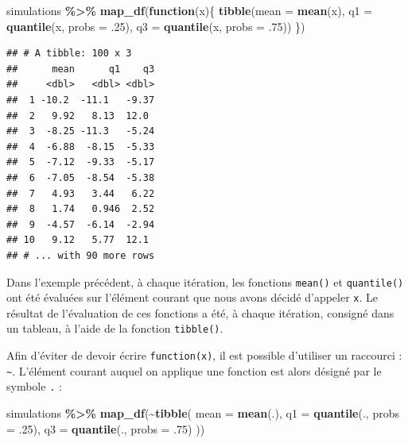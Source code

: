 \documentclass[
  11pt,
]{book}
\newenvironment{Shaded}{\begin{snugshade}}{\end{snugshade}}
\newcommand{\ControlFlowTok}[1]{\textcolor[rgb]{0.13,0.29,0.53}{\textbf{#1}}}
\newcommand{\DataTypeTok}[1]{\textcolor[rgb]{0.13,0.29,0.53}{#1}}
\newcommand{\FloatTok}[1]{\textcolor[rgb]{0.00,0.00,0.81}{#1}}
\newcommand{\KeywordTok}[1]{\textcolor[rgb]{0.13,0.29,0.53}{\textbf{#1}}}
\newcommand{\NormalTok}[1]{#1}
\newcommand{\OperatorTok}[1]{\textcolor[rgb]{0.81,0.36,0.00}{\textbf{#1}}}
\newcommand{\StringTok}[1]{\textcolor[rgb]{0.31,0.60,0.02}{#1}}
\numberwithin{equation}{section}
\numberwithin{countremarque}{section}
\begin{document}
\begin{Shaded}
\begin{Highlighting}[]
\NormalTok{simulations }\OperatorTok{\%\textgreater{}\%}\StringTok{ }
\StringTok{  }\KeywordTok{map\_df}\NormalTok{(}\ControlFlowTok{function}\NormalTok{(x)\{}
    \KeywordTok{tibble}\NormalTok{(}\DataTypeTok{mean =} \KeywordTok{mean}\NormalTok{(x),}
           \DataTypeTok{q1 =} \KeywordTok{quantile}\NormalTok{(x, }\DataTypeTok{probs =} \FloatTok{.25}\NormalTok{),}
           \DataTypeTok{q3 =} \KeywordTok{quantile}\NormalTok{(x, }\DataTypeTok{probs =} \FloatTok{.75}\NormalTok{))}
\NormalTok{  \})}
\end{Highlighting}
\end{Shaded}

\begin{lstlisting}
## # A tibble: 100 x 3
##      mean      q1    q3
##     <dbl>   <dbl> <dbl>
##  1 -10.2  -11.1   -9.37
##  2   9.92   8.13  12.0 
##  3  -8.25 -11.3   -5.24
##  4  -6.88  -8.15  -5.33
##  5  -7.12  -9.33  -5.17
##  6  -7.05  -8.54  -5.38
##  7   4.93   3.44   6.22
##  8   1.74   0.946  2.52
##  9  -4.57  -6.14  -2.94
## 10   9.12   5.77  12.1 
## # ... with 90 more rows
\end{lstlisting}

Dans l'exemple précédent, à chaque itération, les fonctions \texttt{mean()} et \texttt{quantile()} ont été évaluées sur l'élément courant que nous avons décidé d'appeler \texttt{x}. Le résultat de l'évaluation de ces fonctions a été, à chaque itération, consigné dans un tableau, à l'aide de la fonction \texttt{tibble()}.

Afin d'éviter de devoir écrire \texttt{function(x)}, il est possible d'utiliser un raccourci : \texttt{\textasciitilde{}}. L'élément courant auquel on applique une fonction est alors désigné par le symbole \texttt{.} :

\begin{Shaded}
\begin{Highlighting}[]
\NormalTok{simulations }\OperatorTok{\%\textgreater{}\%}\StringTok{ }
\StringTok{  }\KeywordTok{map\_df}\NormalTok{(}\OperatorTok{\textasciitilde{}}\KeywordTok{tibble}\NormalTok{(}
    \DataTypeTok{mean =} \KeywordTok{mean}\NormalTok{(.),}
           \DataTypeTok{q1 =} \KeywordTok{quantile}\NormalTok{(., }\DataTypeTok{probs =} \FloatTok{.25}\NormalTok{),}
           \DataTypeTok{q3 =} \KeywordTok{quantile}\NormalTok{(., }\DataTypeTok{probs =} \FloatTok{.75}\NormalTok{)}
\NormalTok{  ))}
\end{Highlighting}
\end{Shaded}
\end{document}
